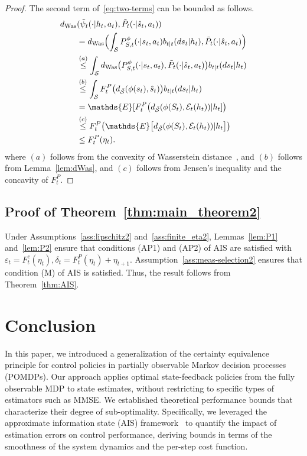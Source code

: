 \documentclass[letterpaper, 10pt]{IEEEtran}
\theoremstyle{plain}
\theoremstyle{nonumberplain}
\newtheorem{proof}{Proof}
\theoremstyle{plain}
\newcommand*\ALPHABET{\mathcal}
\newcommand*\ABSTRACT{\tilde}
\newcommand*\ESTIMATE{\hat}
\newcommand*\EXP{\mathds{E}}
\newcommand\dWas{d_{\mathrm{Was}}}
\newcommand\dhS{d_{\ABSTRACT {\ALPHABET S}}}
\newcommand\EST{\mathcal{E}}
\begin{document}
\begin{proof}
   The second term of~\eqref{eq:two-terms} can be bounded as follows.
   \begin{align}
       \hskip 2em & \hskip -2em
       \dWas(\tilde \psi_{t}(\cdot | h_t, a_t),
       \ABSTRACT P_{t}(\cdot | \ESTIMATE{s}_t, a_t) ) 
       \notag \\
       &= \dWas\Bigl( \int_{\ALPHABET S}P^{\phi}_{S,t}(\cdot|s_t,a_t)b_{t|t}(ds_t|h_t) ,
       \ABSTRACT P_{t}(\cdot | \ESTIMATE s_t, a_t) \Bigr)
       \notag \\
       &\stackrel{(a)}\le \int_{\ALPHABET S}  \dWas\bigl( P^{\phi}_{S,t}(\cdot|s_t,a_t) , \ABSTRACT P_{t}(\cdot | \ESTIMATE{s}_t, a_t) \bigr) b_{t|t}(ds_t|h_t)
       \notag \\
       &\stackrel{(b)}\le \int_{\ALPHABET S}  F^P_t \bigl(\dhS(\phi(s_t),\ESTIMATE{s}_t)\bigr)b_{t|t}(ds_t|h_t)\notag \\
       &= \EXP[ F^P_t\bigl(\dhS(\phi(S_t), \EST_t(h_t)) |  h_t ]\bigr) \notag \\
       &\stackrel{(c)}\le  F^P_t \bigl( \EXP\bigl[\dhS(\phi(S_t), \EST_t(h_t)) |  h_t \bigr]\bigr) \notag \\
       &\le F^P_t (\eta_t). \label{eq:2nd-term}
   \end{align}
   where $(a)$ follows from the convexity of Wasserstein distance~\cite[Thm. 4.8]{villani2009optimal},  and $(b)$ follows from Lemma~\ref{lem:dWas}, 
   and $(c)$ follows from Jensen's inequality and the concavity of $F_t^P.$
   \end{proof}
\subsection{Proof of Theorem~\ref{thm:main_theorem2}}\label{sec:thm_proof}
Under Assumptions~\ref{ass:lipschitz2} and~\ref{ass:finite_eta2}, Lemmas~\ref{lem:P1} and~\ref{lem:P2} ensure that conditions (AP1) and (AP2) of AIS are satisfied with $\varepsilon_t = F^c_t (\eta_t), \delta_t = F^P_t (\eta_t) + \eta_{t+1} $. Assumption~\ref{ass:meas-selection2} ensures that condition (M) of AIS is satisfied. Thus, the result follows from Theorem~\ref{thm:AIS}.

\section{Conclusion}\label{sec:conclusion}
In this paper, we introduced a generalization of the certainty equivalence principle for control policies in partially observable Markov decision processes (POMDPs). Our approach applies optimal state-feedback policies from the fully observable MDP to state estimates, without restricting to specific types of estimators such as MMSE. We established theoretical performance bounds that characterize their degree of sub-optimality. Specifically, we leveraged the approximate information state (AIS) framework~\cite{AIS} to quantify the impact of estimation errors on control performance, deriving bounds in terms of the smoothness of the system dynamics and the per-step cost function.
\end{document}
